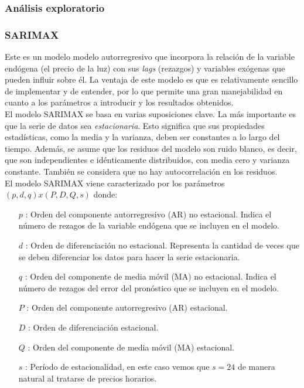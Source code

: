 \subsubsection{Análisis exploratorio}
%
%
%

%
%
%
\subsubsection{SARIMAX}
%
%
%
Este es un modelo modelo autorregresivo que incorpora la relación de la variable endógena (el precio de la luz) con sus \textit{lags} (rezazgos) y variables exógenas que pueden influir sobre él. La ventaja de este modelo es que es relativamente sencillo de implementar y de entender, por lo que permite una gran manejabilidad en cuanto a los parámetros a introducir y los resultados obtenidos.\\

El modelo SARIMAX se basa en varias suposiciones clave. La más importante es que la serie de datos sea \textit{estacionaria}. Esto significa que sus propiedades estadísticas, como la media y la varianza, deben ser constantes a lo largo del tiempo. Además, se asume que los residuos del modelo son ruido blanco, es decir, que son independientes e idénticamente distribuidos, con media cero y varianza constante. También se considera que no hay autocorrelación en los residuos.\\

El modelo SARIMAX viene caracterizado por los parámetros $(p,d,q)x(P,D,Q,s)$ donde:
\begin{itemize}
    \item[$p$]: Orden del componente autorregresivo (AR) no estacional. Indica el número de rezagos de la variable endógena que se incluyen en el modelo.
    \item[$d$]: Orden de diferenciación no estacional. Representa la cantidad de veces que se deben diferenciar los datos para hacer la serie estacionaria.
    \item[$q$]: Orden del componente de media móvil (MA) no estacional. Indica el número de rezagos del error del pronóstico que se incluyen en el modelo.
    \item[$P$]: Orden del componente autorregresivo (AR) estacional.
    \item[$D$]: Orden de diferenciación estacional.
    \item[$Q$]: Orden del componente de media móvil (MA) estacional.
    \item[$s$]: Período de estacionalidad, en este caso vemos que $s=24$ de manera natural al tratarse de precios horarios.
\end{itemize}

